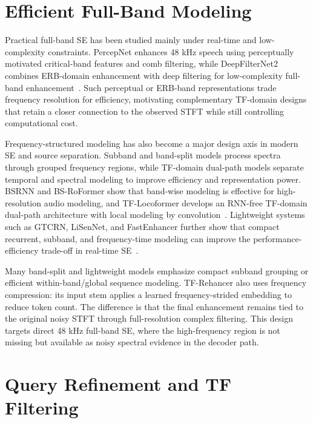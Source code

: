 \section{Efficient Full-Band Modeling}
\label{sec:related_practical_frequency_structured}

Practical full-band SE has been studied mainly under real-time and low-complexity constraints. PercepNet enhances 48 kHz speech using perceptually motivated critical-band features and comb filtering, while DeepFilterNet2 combines ERB-domain enhancement with deep filtering for low-complexity full-band enhancement~\cite{valin2020percepnet,schroter2022deepfilternet2}. Such perceptual or ERB-band representations trade frequency resolution for efficiency, motivating complementary TF-domain designs that retain a closer connection to the observed STFT while still controlling computational cost.

Frequency-structured modeling has also become a major design axis in modern SE and source separation. Subband and band-split models process spectra through grouped frequency regions, while TF-domain dual-path models separate temporal and spectral modeling to improve efficiency and representation power. BSRNN and BS-RoFormer show that band-wise modeling is effective for high-resolution audio modeling, and TF-Locoformer develops an RNN-free TF-domain dual-path architecture with local modeling by convolution~\cite{luo2022bsrnn,lu2023bsroformer,saijo2024tflocoformer}. Lightweight systems such as GTCRN, LiSenNet, and FastEnhancer further show that compact recurrent, subband, and frequency-time modeling can improve the performance-efficiency trade-off in real-time SE~\cite{gtcrn,lisennet,ahn2025fastenhancer}.

Many band-split and lightweight models emphasize compact subband grouping or efficient within-band/global sequence modeling. TF-Rehancer also uses frequency compression: its input stem applies a learned frequency-strided embedding to reduce token count. The difference is that the final enhancement remains tied to the original noisy STFT through full-resolution complex filtering. This design targets direct 48 kHz full-band SE, where the high-frequency region is not missing but available as noisy spectral evidence in the decoder path.

\section{Query Refinement and TF Filtering}
\label{sec:related_query_filtering}

